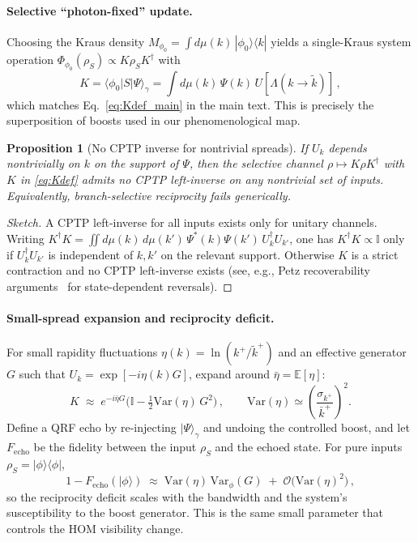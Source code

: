 \documentclass[aps,11pt]{article}
\providecommand{\bra}[1]{\langle #1|}
\providecommand{\ket}[1]{|#1\rangle}
\newcommand{\Var}{\mathrm{Var}}
\newcommand{\E}{\mathbb{E}}
\newcommand{\kplus}{k^{+}}
\newcommand{\kbar}{\bar{k}^{+}}
\newcommand{\ktil}{\tilde{k}^{+}}
\newtheorem{prop}{Proposition}
\begin{document}
\paragraph{Selective ``photon-fixed'' update.}
Choosing the Kraus density \(M_{\phi_0}=\int d\mu(k)\,\ket{\phi_0}\!\bra{k}\) yields a single-Kraus system operation \(\Phi_{\phi_0}(\rho_S)\propto K\rho_S K^\dagger\) with
\begin{equation}\label{eq:Kdef}
K=\bra{\phi_0}S\ket{\Psi}_\gamma=\int d\mu(k)\,\Psi(k)\,U[\Lambda(k\!\to\!\tilde k)]\,,
\end{equation}
which matches Eq.~\eqref{eq:Kdef_main} in the main text. This is precisely the superposition of boosts used in our phenomenological map.

\begin{prop}[No CPTP inverse for nontrivial spreads]\label{prop:inverse}
If \(U_k\) depends nontrivially on \(k\) on the support of \(\Psi\), then the selective channel \(\rho\mapsto K\rho K^\dagger\) with \(K\) in \eqref{eq:Kdef} admits no CPTP left-inverse on any nontrivial set of inputs. Equivalently, branch-selective reciprocity fails generically.
\end{prop}
\begin{proof}[Sketch]
A CPTP left-inverse for all inputs exists only for unitary channels. Writing \(K^\dagger K=\iint d\mu(k)\,d\mu(k')\,\Psi^*(k)\Psi(k')\,U_k^\dagger U_{k'}\), one has \(K^\dagger K\propto \mathbb I\) only if \(U_k^\dagger U_{k'}\) is independent of \(k,k'\) on the relevant support. Otherwise \(K\) is a strict contraction and no CPTP left-inverse exists (see, e.g., Petz recoverability arguments~\cite{Petz1986} for state-dependent reversals).
\end{proof}

\paragraph{Small-spread expansion and reciprocity deficit.}
For small rapidity fluctuations \(\eta(k)=\ln(\kplus/\ktil)\) and an effective generator \(G\) such that \(U_k=\exp[-i\eta(k)G]\), expand around \(\bar\eta=\E[\eta]\):
\begin{equation}
K \;\approx\; e^{-i\bar\eta G}\Big(\mathbb I - \tfrac{1}{2}\Var(\eta)\,G^2\Big)\,,
\qquad \Var(\eta)\simeq \left(\frac{\sigma_{\kplus}}{\kbar}\right)^{2}.
\end{equation}
Define a QRF echo by re-injecting \(\ket{\Psi}_\gamma\) and undoing the controlled boost, and let \(F_{\mathrm{echo}}\) be the fidelity between the input \(\rho_S\) and the echoed state. For pure inputs \(\rho_S=\ket{\phi}\bra{\phi}\),
\begin{equation}\label{eq:echo}
1-F_{\mathrm{echo}}(\ket{\phi}) \;\approx\; \Var(\eta)\,\Var_{\phi}(G) \;+\; \mathcal O\!\big(\Var(\eta)^{2}\big)\,,
\end{equation}
so the reciprocity deficit scales with the bandwidth and the system's susceptibility to the boost generator. This is the same small parameter that controls the HOM visibility change.
\end{document}
